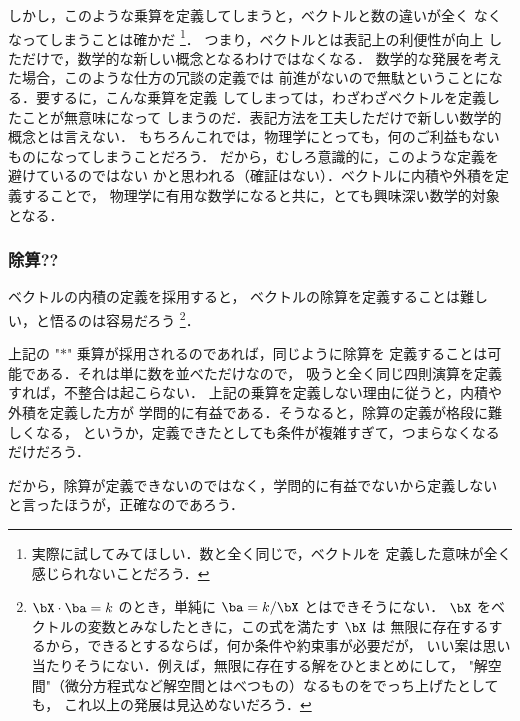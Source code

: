             しかし，このような乗算を定義してしまうと，ベクトルと数の違いが全く
            なくなってしまうことは確かだ
                \footnote{
                    実際に試してみてほしい．数と全く同じで，ベクトルを
                    定義した意味が全く感じられないことだろう．
                }．
            つまり，ベクトルとは表記上の利便性が向上
            しただけで，数学的な新しい概念となるわけではなくなる．
            数学的な発展を考えた場合，このような仕方の冗談の定義では
            前進がないので無駄ということになる．要するに，こんな乗算を定義
            してしまっては，わざわざベクトルを定義したことが無意味になって
            しまうのだ．表記方法を工夫しただけで新しい数学的概念とは言えない．
            もちろんこれでは，物理学にとっても，何のご利益もない
            ものになってしまうことだろう．
            だから，むしろ意識的に，このような定義を避けているのではない
            かと思われる（確証はない）．ベクトルに内積や外積を定義することで，
            物理学に有用な数学になると共に，とても興味深い数学的対象となる．

        \subsubsection{除算??}
            ベクトルの内積の定義を採用すると，
            ベクトルの除算を定義することは難しい，と悟るのは容易だろう
            \footnote{
                $\bX\cdot\ba=k$ のとき，単純に $\ba=k/\bX$ とはできそうにない．
                $\bX$ をベクトルの変数とみなしたときに，この式を満たす $\bX$ は
                無限に存在するするから，できるとするならば，何か条件や約束事が必要だが，
                いい案は思い当たりそうにない．例えば，無限に存在する解をひとまとめにして，
                "解空間"（微分方程式など解空間とはべつもの）なるものをでっち上げたとしても，
                これ以上の発展は見込めないだろう．
            }．

            上記の "$\ast$" 乗算が採用されるのであれば，同じように除算を
            定義することは可能である．それは単に数を並べただけなので，
            吸うと全く同じ四則演算を定義すれば，不整合は起こらない．
            上記の乗算を定義しない理由に従うと，内積や外積を定義した方が
            学問的に有益である．そうなると，除算の定義が格段に難しくなる，
            というか，定義できたとしても条件が複雑すぎて，つまらなくなるだけだろう．

            だから，除算が定義できないのではなく，学問的に有益でないから定義しない
            と言ったほうが，正確なのであろう．

